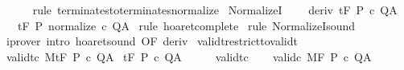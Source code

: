 \begin{isabellebody}
\ \ \ \ \isamarkupfalse%
\ {\isacharparenleft}rule\ terminates{\isacharunderscore}to{\isacharunderscore}terminates{\isacharunderscore}normalize{\isacharparenright}\isanewline
{}\isamarkupfalse%
%
\endisatagproof
{\isafoldproof}%
%
\isadelimproof
\isanewline
%
\endisadelimproof
\isanewline
{}\isamarkupfalse%
\ NormalizeI{\isacharcolon}\ \isanewline
\ \ \ deriv{\isacharcolon}\ {\isachardoublequoteopen}{\isasymGamma}{\isacharcomma}{\isasymTheta}{\isasymturnstile}\isactrlsub t\isactrlbsub {\isacharslash}F\isactrlesub \ P\ c\ Q{\isacharcomma}A{\isachardoublequoteclose}\isanewline
\ \ \ {\isachardoublequoteopen}{\isasymGamma}{\isacharcomma}{\isasymTheta}{\isasymturnstile}\isactrlsub t\isactrlbsub {\isacharslash}F\isactrlesub \ P\ {\isacharparenleft}normalize\ c{\isacharparenright}\ Q{\isacharcomma}A{\isachardoublequoteclose}\isanewline
%
\isadelimproof
%
\endisadelimproof
%
\isatagproof
{}\isamarkupfalse%
\ {\isacharparenleft}rule\ hoaret{\isacharunderscore}complete{\isacharprime}{\isacharparenright}\isanewline
{}\isamarkupfalse%
\ {\isacharparenleft}rule\ NormalizeI{\isacharunderscore}sound{\isacharparenright}\isanewline
{}\isamarkupfalse%
\ {\isacharparenleft}iprover\ intro{\isacharcolon}\ hoaret{\isacharunderscore}sound\ {\isacharbrackleft}OF\ deriv{\isacharbrackright}{\isacharparenright}\isanewline
{}\isamarkupfalse%
%
\endisatagproof
{\isafoldproof}%
%
\isadelimproof
%
\endisadelimproof
%
\isamarkuptrue%
\isamarkupfalse%
\ validt{\isacharunderscore}restrict{\isacharunderscore}to{\isacharunderscore}validt{\isacharcolon}\isanewline
{}\ validt{\isacharunderscore}c{\isacharcolon}\ {\isachardoublequoteopen}{\isasymGamma}{\isacharbar}\isactrlbsub M\isactrlesub {\isasymTurnstile}\isactrlsub t\isactrlbsub {\isacharslash}F\isactrlesub \ P\ c\ Q{\isacharcomma}A{\isachardoublequoteclose}\isanewline
{}\ {\isachardoublequoteopen}{\isasymGamma}{\isasymTurnstile}\isactrlsub t\isactrlbsub {\isacharslash}F\isactrlesub \ P\ c\ Q{\isacharcomma}A{\isachardoublequoteclose}\isanewline
%
\isadelimproof
%
\endisadelimproof
%
\isatagproof
{}\isamarkupfalse%
\ {\isacharminus}\isanewline
\ \ \isamarkupfalse%
\ validt{\isacharunderscore}c\isanewline
\ \ \isamarkupfalse%
\ valid{\isacharunderscore}c{\isacharcolon}\ {\isachardoublequoteopen}{\isasymGamma}{\isacharbar}\isactrlbsub M\isactrlesub {\isasymTurnstile}\isactrlbsub {\isacharslash}F\isactrlesub \ P\ c\ Q{\isacharcomma}A{\isachardoublequoteclose}\ \isamarkupfalse%

\end{isabellebody}
